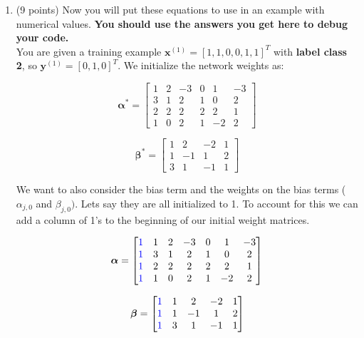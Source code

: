 \documentclass[11pt]{exam}
\numberwithin{equation}{section} %
\numberwithin{figure}{section} %
\numberwithin{table}{section} %
\newcommand{\xv}{\mathbf{x}}
\newcommand{\yv}{\mathbf{y}}
\begin{document}
\begin{enumerate}
\begin{questions}
	    \end{questions}
	
	    
	
	\item (9 points) Now you will put these equations to use in an example with numerical values. \textbf{You should use the answers you get here to debug your code.} \\
	You are given a training example $\xv^{(1)}=[1,1,0,0,1,1]^T$ with \textbf{label class 2}, so $\yv^{(1)}=[0,1,0]^T$. We initialize the network weights as:
	\begin{center}
	$$\boldsymbol{\alpha^*}=
	    \begin{bmatrix}
	    1 & 2 & -3 & 0 & 1 & -3 \\
	    3 & 1 & 2 & 1 & 0 & 2 \\
	    2 & 2 & 2 & 2 & 2 & 1 \\
	    1 & 0 & 2 & 1 & -2 & 2
	    \end{bmatrix}$$
	    
	$$\boldsymbol{\beta^*}=
	    \begin{bmatrix}
	    1 & 2 & -2 & 1 \\
	    1 & -1 & 1 & 2 \\
	    3 & 1 & -1 & 1
	    \end{bmatrix}
	$$
	\end{center}
	    
	We want to also consider the bias term and the weights on the bias terms (${\alpha}_{j,0}$ and ${\beta}_{j,0})$. Lets say they are all initialized to 1. To account for this we can add a column of 1's to the beginning of our initial weight matrices. 
	
	$$\boldsymbol{\alpha}=
	    \begin{bmatrix}
	    \textcolor{blue}{1} & 1 & 2 & -3 & 0 & 1 & -3 \\
	    \textcolor{blue}{1} & 3 & 1 & 2 & 1 & 0 & 2 \\
	    \textcolor{blue}{1} & 2 & 2 & 2 & 2 & 2 & 1 \\
	    \textcolor{blue}{1} & 1 & 0 & 2 & 1 & -2 & 2
	    \end{bmatrix}$$
	    
	$$\boldsymbol{\beta}=
	    \begin{bmatrix}
	    \textcolor{blue}{1} & 1 & 2 & -2 & 1 \\
	    \textcolor{blue}{1} & 1 & -1 & 1 & 2 \\
	    \textcolor{blue}{1} & 3 & 1 & -1 & 1
	    \end{bmatrix}
	$$
	

\end{enumerate}
\end{document}
